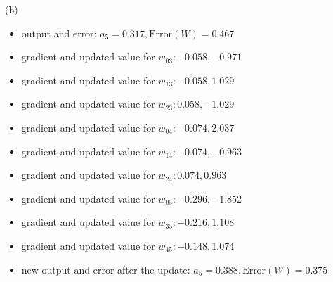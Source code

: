 (b)
\begin{itemize}
    \item output and error: $a_5 = 0.317, \text{Error}(W) = 0.467$
    \item gradient and updated value for $w_{03}: -0.058, -0.971$
    \item gradient and updated value for $w_{13}: -0.058, 1.029$
    \item gradient and updated value for $w_{23}: 0.058, -1.029$
    \item gradient and updated value for $w_{04}: -0.074, 2.037$
    \item gradient and updated value for $w_{14}: -0.074, -0.963$
    \item gradient and updated value for $w_{24}: 0.074, 0.963$
    \item gradient and updated value for $w_{05}: -0.296, -1.852$
    \item gradient and updated value for $w_{35}: -0.216, 1.108$
    \item gradient and updated value for $w_{45}: -0.148, 1.074$
    \item new output and error after the update: $a_5 = 0.388, \text{Error}(W) = 0.375$
\end{itemize}

\newpage